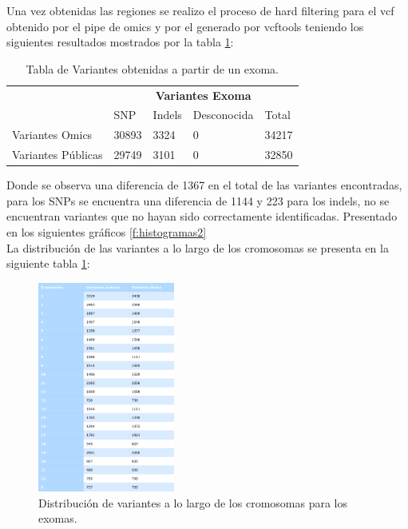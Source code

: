 Una vez obtenidas las regiones se realizo el proceso de hard filtering para el vcf obtenido por el pipe de omics y por el generado por vcftools teniendo los siguientes resultados mostrados por la tabla \ref{tabla:tabla2}: \\

\begin{table}[H]
	\centering  
	\begin{tabular}{|l|l|l|l|l|}
		\hline
		& \multicolumn{4}{c|}{\textbf{Variantes Exoma}} \\
		\cline{2-5} 
		& SNP  & Indels & Desconocida & Total \\ \cline{2-5}
		\hline 
		\multirow{1}{4cm}{Variantes Omics} & 30893 & 3324 & 0 & 34217 \\ \cline{2-5}
		\hline 
		\multirow{1}{4cm}{Variantes Públicas} & 29749 & 3101 & 0 & 32850 \\ \cline{2-5}
		\hline
	\end{tabular}
	\caption{Tabla de Variantes obtenidas a partir de un exoma.}
	\label{tabla:tabla2}
\end{table} 

Donde se observa una diferencia de 1367 en el total de las variantes encontradas, para los SNPs se encuentra una diferencia de 1144 y 223 para los indels, no se encuentran variantes que no hayan sido correctamente identificadas. Presentado en los siguientes gráficos \ref{f:histogramas2} \\

La distribución de las variantes a lo largo de los cromosomas se presenta en la siguiente tabla \ref{fig:tabla2}:

\begin{figure}[H]
	\centering
	\includegraphics[width=0.4\textwidth]{Kap2/latex_table2}
	\caption{Distribución de variantes a lo largo de los cromosomas para los exomas.} \label{fig:tabla2}
\end{figure}

